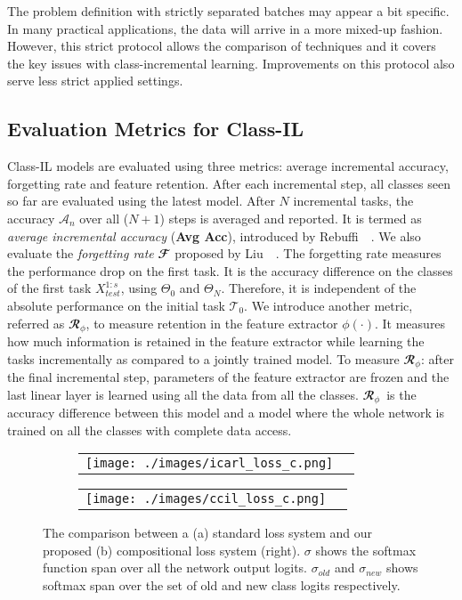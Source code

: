 \documentclass[final]{cvpr}
\newcommand{\cfr}{$\mathbfcal{R}_{\phi}$} \newcommand\todo[1]{(\textcolor{red}{TODO: #1})}
\begin{document}
The problem definition with strictly separated batches may appear a bit specific. In many practical applications, the data will arrive in a more mixed-up fashion. However, this strict protocol allows the comparison of techniques and it covers the key issues with class-incremental learning. Improvements on this protocol also serve less strict applied settings. 

\subsection{Evaluation Metrics for Class-IL}
\label{sec:classil_metrics}
Class-IL models are evaluated using three metrics: average incremental accuracy, forgetting rate and feature retention.
After each incremental step, all classes seen so far are evaluated using the latest model. After $N$ incremental tasks, the accuracy $\mathcal{A}_n$  over all ($N+1$) steps is averaged and reported. It is termed as \textit{average incremental accuracy} (\textbf{Avg Acc}), introduced by Rebuffi~\etal~\cite{icarl}.
We also evaluate the\textit{ forgetting rate} $\mathbfcal{F}$ proposed by Liu~\etal~\cite{mnemonics}. The forgetting rate measures the performance drop on the first task. It is the accuracy difference on the classes of the first task $X^{1:s}_{test}$, using $\Theta_0$ and $\Theta_N$. Therefore, it is independent of the absolute performance on the initial task $\mathcal{T}_0$. 
We introduce another metric, referred as \cfr, to measure retention in the feature extractor $\phi(\cdot)$. It measures how much information is retained in the feature extractor while learning the tasks incrementally as compared to a jointly trained model. To measure \cfr: after the final incremental step, parameters of the feature extractor are frozen and the last linear layer is learned using all the data from all the classes. \cfr~is the accuracy difference between this model and a model where the whole network is trained on all the classes with complete data access. 

\begin{figure*}[t]
\centering
\begin{subfigure}[b]{.5\textwidth}
 \begin{tabular}{cc}
  \centering
  \texttt{[image: ./images/icarl\_loss\_c.png]}
  \end{tabular}
  \caption{}
  \label{fig:comb_softmax}
\end{subfigure}\begin{subfigure}[b]{.5\textwidth}
 \begin{tabular}{cc}
  \centering
  \texttt{[image: ./images/ccil\_loss\_c.png]}
  \end{tabular}
  \caption{}
  \label{fig:sep_softmax}
\end{subfigure}
\caption{The comparison between a (a) standard loss system and our proposed (b) compositional loss system (right). $\sigma$ shows the softmax function span over all the network output logits. $\sigma_{old}$ and $\sigma_{new}$ shows softmax span over the set of old and new class logits respectively. }
\label{fig:ccil_vs_icarl}
\end{figure*}
\end{document}
